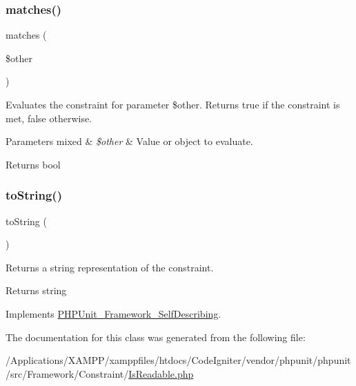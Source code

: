 \subsubsection{\texorpdfstring{matches()}{matches()}}
{\footnotesize\ttfamily matches (\begin{DoxyParamCaption}\item[{}]{\$other }\end{DoxyParamCaption})\hspace{0.3cm}{\ttfamily [protected]}}

Evaluates the constraint for parameter \$other. Returns true if the constraint is met, false otherwise.


\begin{DoxyParams}[1]{Parameters}
mixed & {\em \$other} & Value or object to evaluate.\\
\hline
\end{DoxyParams}
\begin{DoxyReturn}{Returns}
bool 
\end{DoxyReturn}
\mbox{\label{class_p_h_p_unit___framework___constraint___is_readable_a5558c5d549f41597377fa1ea8a1cefa3}} 
\subsubsection{\texorpdfstring{to\+String()}{toString()}}
{\footnotesize\ttfamily to\+String (\begin{DoxyParamCaption}{ }\end{DoxyParamCaption})}

Returns a string representation of the constraint.

\begin{DoxyReturn}{Returns}
string 
\end{DoxyReturn}


Implements \mbox{\hyperlink{interface_p_h_p_unit___framework___self_describing_a5558c5d549f41597377fa1ea8a1cefa3}{P\+H\+P\+Unit\+\_\+\+Framework\+\_\+\+Self\+Describing}}.



The documentation for this class was generated from the following file\+:\begin{DoxyCompactItemize}
\item 
/\+Applications/\+X\+A\+M\+P\+P/xamppfiles/htdocs/\+Code\+Igniter/vendor/phpunit/phpunit/src/\+Framework/\+Constraint/\mbox{\hyperlink{_is_readable_8php}{Is\+Readable.\+php}}\end{DoxyCompactItemize}
